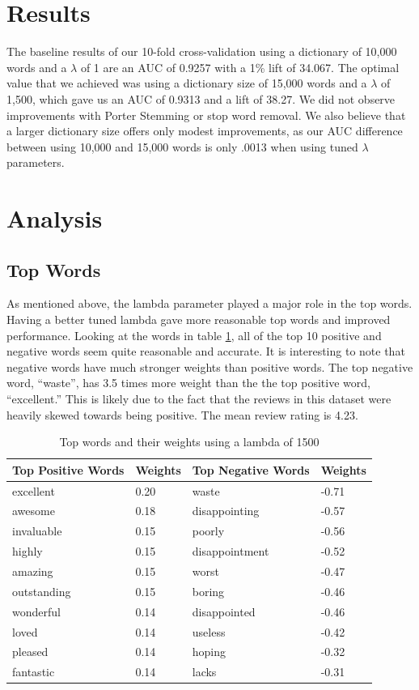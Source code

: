 \documentclass{article}
\begin{document}
\section{Results}
The baseline results of our 10-fold cross-validation using a dictionary of 10,000 words and a $\lambda$ of 1 are an AUC of 0.9257 with a 1\% lift of 34.067. The optimal value that we achieved was using a dictionary size of 15,000 words and a $\lambda$ of 1,500, which gave us an AUC of 0.9313 and a lift of 38.27. We did not observe improvements with Porter Stemming or stop word removal. We also believe that a larger dictionary size offers only modest improvements, as our AUC difference between using 10,000 and 15,000 words is only .0013 when using tuned $\lambda$ parameters.


\section{Analysis}
\subsection{Top Words}
As mentioned above, the lambda parameter played a major role in the top words. Having a better tuned lambda gave more reasonable top words and improved performance. Looking at the words in table \ref{tab:words}, all of the top 10 positive and negative words seem quite reasonable and accurate. It is interesting to note that negative words have much stronger weights than positive words. The top negative word, ``waste'', has 3.5 times more weight than the the top positive word, ``excellent.'' This is likely due to the fact that the reviews in this dataset were heavily skewed towards being positive. The mean review rating is 4.23. 

\begin{table}[h]
    \begin{tabular}{|l|l|l|l|}
        \hline
        Top Positive Words & Weights & Top Negative Words & Weights \\ \hline
        excellent   & 0.20 & waste          & -0.71 \\ 
        awesome     & 0.18 & disappointing  & -0.57 \\ 
        invaluable  & 0.15 & poorly         & -0.56 \\ 
        highly      & 0.15 & disappointment & -0.52 \\ 
        amazing     & 0.15 & worst          & -0.47 \\ 
        outstanding & 0.15 & boring         & -0.46 \\ 
        wonderful   & 0.14 & disappointed   & -0.46 \\ 
        loved       & 0.14 & useless        & -0.42 \\ 
        pleased     & 0.14 & hoping         & -0.32 \\ 
        fantastic   & 0.14 & lacks          & -0.31 \\
        \hline
    \end{tabular}
    \caption{Top words and their weights using a lambda of 1500}
    \label{tab:words}
\end{table}
\end{document}
